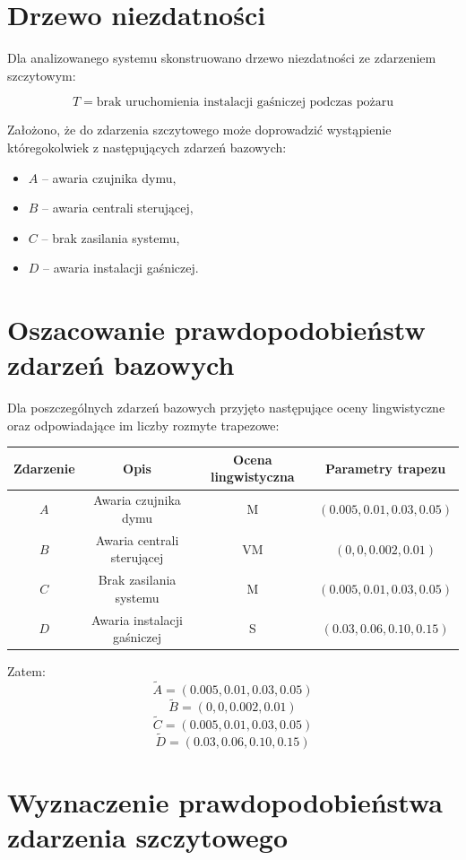 \documentclass[11pt,a4paper]{article}
\begin{document}
\section{Drzewo niezdatności}

Dla analizowanego systemu skonstruowano drzewo niezdatności ze zdarzeniem szczytowym:

\[
T = \text{brak uruchomienia instalacji gaśniczej podczas pożaru}
\]

Założono, że do zdarzenia szczytowego może doprowadzić wystąpienie któregokolwiek z następujących zdarzeń bazowych:
\begin{itemize}
\item $A$ -- awaria czujnika dymu,
\item $B$ -- awaria centrali sterującej,
\item $C$ -- brak zasilania systemu,
\item $D$ -- awaria instalacji gaśniczej.
\end{itemize}

\section{Oszacowanie prawdopodobieństw zdarzeń bazowych}

Dla poszczególnych zdarzeń bazowych przyjęto następujące oceny lingwistyczne oraz odpowiadające im liczby rozmyte trapezowe:

\begin{center}
\begin{tabular}{cccc}
\toprule
Zdarzenie & Opis & Ocena lingwistyczna & Parametry trapezu \\
\midrule
$A$ & Awaria czujnika dymu & M  & $(0.005,0.01,0.03,0.05)$ \\
$B$ & Awaria centrali sterującej & VM & $(0,0,0.002,0.01)$ \\
$C$ & Brak zasilania systemu & M  & $(0.005,0.01,0.03,0.05)$ \\
$D$ & Awaria instalacji gaśniczej & S  & $(0.03,0.06,0.10,0.15)$ \\
\bottomrule
\end{tabular}
\end{center}

Zatem:
\[
\tilde{A}=(0.005,0.01,0.03,0.05)
\]
\[
\tilde{B}=(0,0,0.002,0.01)
\]
\[
\tilde{C}=(0.005,0.01,0.03,0.05)
\]
\[
\tilde{D}=(0.03,0.06,0.10,0.15)
\]

\section{Wyznaczenie prawdopodobieństwa zdarzenia szczytowego}
\end{document}
